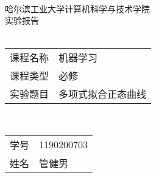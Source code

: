 \begin{center}
    \quad \vspace{3cm} \\
    \Large
    哈尔滨工业大学计算机科学与技术学院 \\
    
    \Huge
    实验报告 \\
    \quad \vspace{1cm} \\
    
    \Large
    \begin{tabular}{r@{：}l}
        课程名称 & 机器学习 \\
        课程类型 & 必修 \\
        实验题目 & 多项式拟合正态曲线 \\
    \end{tabular}
    \quad \vspace{1cm} \\
    
    \large
    \begin{tabular}{r@{：}l}
    学号 & 1190200703 \\
    姓名 & 管健男 \\
    \end{tabular}

\end{center}
